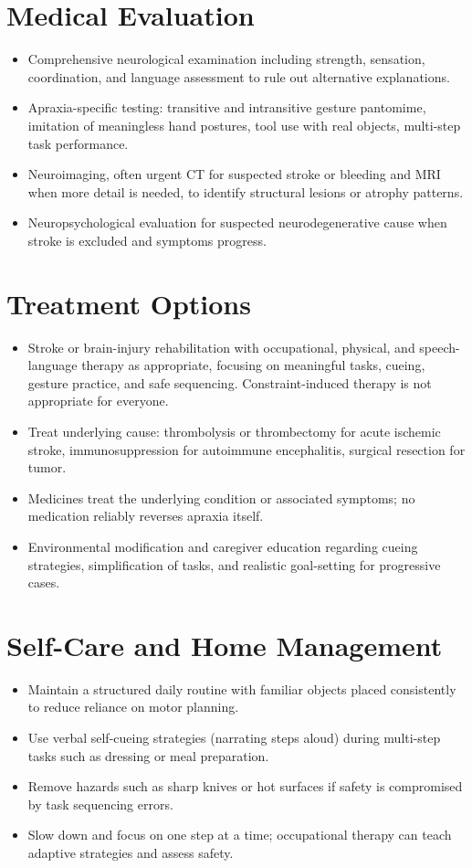 \section*{Medical Evaluation}
\begin{itemize}
 \item Comprehensive neurological examination including strength, sensation, coordination, and language assessment to rule out alternative explanations.
 \item Apraxia-specific testing: transitive and intransitive gesture pantomime, imitation of meaningless hand postures, tool use with real objects, multi-step task performance.
 \item Neuroimaging, often urgent CT for suspected stroke or bleeding and MRI when more detail is needed, to identify structural lesions or atrophy patterns.
 \item Neuropsychological evaluation for suspected neurodegenerative cause when stroke is excluded and symptoms progress.
\end{itemize}

\section*{Treatment Options}
\begin{itemize}
 \item Stroke or brain-injury rehabilitation with occupational, physical, and speech-language therapy as appropriate, focusing on meaningful tasks, cueing, gesture practice, and safe sequencing. Constraint-induced therapy is not appropriate for everyone.
 \item Treat underlying cause: thrombolysis or thrombectomy for acute ischemic stroke, immunosuppression for autoimmune encephalitis, surgical resection for tumor.
 \item Medicines treat the underlying condition or associated symptoms; no medication reliably reverses apraxia itself.
 \item Environmental modification and caregiver education regarding cueing strategies, simplification of tasks, and realistic goal-setting for progressive cases.
\end{itemize}

\section*{Self-Care and Home Management}
\begin{itemize}
 \item Maintain a structured daily routine with familiar objects placed consistently to reduce reliance on motor planning.
 \item Use verbal self-cueing strategies (narrating steps aloud) during multi-step tasks such as dressing or meal preparation.
 \item Remove hazards such as sharp knives or hot surfaces if safety is compromised by task sequencing errors.
 \item Slow down and focus on one step at a time; occupational therapy can teach adaptive strategies and assess safety.
\end{itemize}

